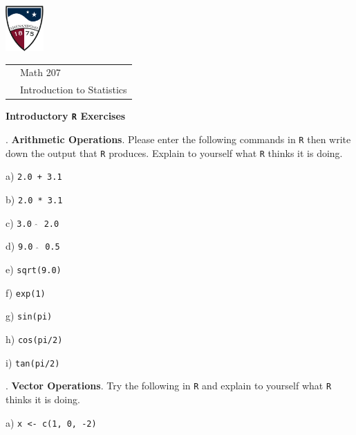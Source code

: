 \documentclass[10pt]{article}
\newcounter{EX}\setcounter{EX}{1}
\newcommand{\EXERCISE}{\arabic{EX}.\stepcounter{EX} }
\begin{document}
\pagestyle{empty}
\lstset{language=R, showspaces=false, showstringspaces=false}

\href{http://www.su.edu}{\includegraphics[height=1.75cm]{sulogo.eps}}
\vspace{-1.69cm}

{\small \hfill
\begin{tabular}{cl}
& Math 207\\& Introduction to Statistics\\
\end{tabular}
}
\setlength{\baselineskip}{1.05\baselineskip}
\medskip

\begin{center}
\textbf{\large  Introductory \texttt{R} Exercises}
\end{center}

\newcommand{\SUBX}{\smallskip\hspace{10pt}}
\newcommand{\BSK}{\vspace{.14in}}

\EXERCISE \textbf{Arithmetic Operations}.
Please enter the following commands in \texttt{R} then write down the output
that \texttt{R} produces. Explain to yourself what \texttt{R} thinks it
is doing.

\SUBX a) \texttt{2.0 + 3.1}
\BSK

\SUBX b) \texttt{2.0 * 3.1}
\BSK

\SUBX c) \texttt{3.0 $\widehat{\hspace{3pt}}$ 2.0}
\BSK

\SUBX d) \texttt{9.0  $\widehat{\hspace{3pt}}$  0.5}
\BSK

\SUBX e) \texttt{sqrt(9.0)}
\BSK

\SUBX f) \texttt{exp(1)}
\BSK

\SUBX g) \texttt{sin(pi)}
\BSK

\SUBX h) \texttt{cos(pi/2)}
\BSK

\SUBX i) \texttt{tan(pi/2)}
\BSK

\EXERCISE \textbf{Vector Operations}.
Try the following in \texttt{R} and explain to yourself
what \texttt{R} thinks it is doing.
\vspace{-5pt}

\SUBX a) \texttt{x <- c(1, 0, -2)}
\BSK
\end{document}

